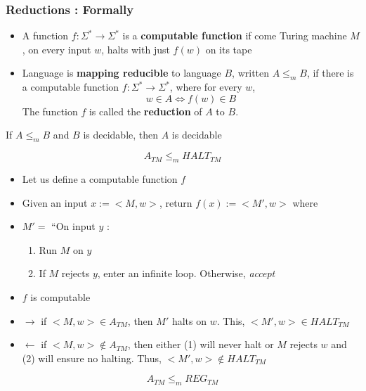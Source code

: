 \documentclass[12pt,a4paper]{article}
\newcommand{\halt}{\ensuremath{HALT_{TM}} }
\newcommand{\atm}{\ensuremath{A_{TM}} }
\newcommand{\reg}{\ensuremath{REG_{TM}} }
\newcommand{\<}{\langle}
\renewcommand{\>}{\rangle}
\begin{document}
\subsubsection{Reductions : Formally}
\begin{blackbox}
   \begin{itemize}
     \item A function $f: \Sigma^* \to \Sigma^*$ is a \textbf{computable function} if come Turing machine $M$, on every input $w$, halts with just $f(w)$ on its tape
     \item Language is \textbf{mapping reducible} to language $B$, written $A \leq_m B$, if there is a computable function $f: \Sigma^* \to \Sigma^*$, where for every $w$,
     \[w \in A \iff f(w) \in B\]
     The function $f$ is called the \textbf{reduction} of $A$ to $B$.
\end{itemize}
\end{blackbox}
\begin{boite}
     If $A \leq_m B$ and $B$ is decidable, then $A$ is decidable
\end{boite}
\begin{boite}
    \[\atm \leq_m \halt\]
\end{boite}
\begin{itemize}
    \item Let us define a computable function $f$
    \item Given an input $x := <M,w>$, return $f(x) := <M',w>$ where
    \item $M' = $ ``On input $y$ :
            \begin{enumerate}
                \item Run $M$ on $y$
                \item If $M$ rejects $y$, enter an infinite loop. Otherwise, \textit{accept}
            \end{enumerate}
    \item $f$ is computable
    \item $\to$ if $<M,w> \in \atm$, then $M'$ halts on $w$. This, $<M',w> \in \halt$
    \item $\leftarrow$ if $<M,w> \notin \atm$, then either (1) will never halt or $M$ rejects $w$ and (2) will ensure no halting. Thus, $<M',w> \notin \halt$
\end{itemize}
\begin{boite}
    \[\atm \leq_m \reg\]
\end{boite}
\end{document}
